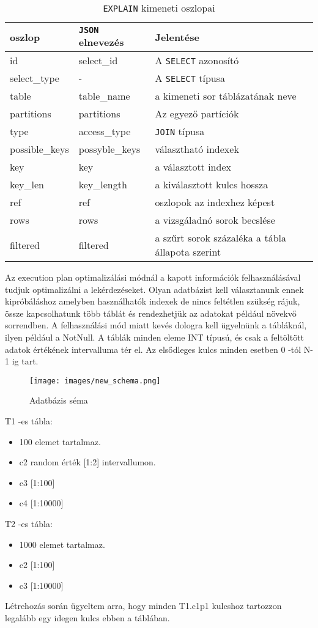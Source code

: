 \begin{table}[h!]
\centering
\caption{\texttt{EXPLAIN} kimeneti oszlopai}
\medskip
\label{tab:cpuvsgpu}
\begin{tabular}{|p{4cm}|p{4cm}|p{6cm}|}
\hline
oszlop & \texttt{JSON} elnevezés & Jelentése \\
\hline
id & select\_id & A \texttt{SELECT} azonosító \\
\hline
select\_type & - & A \texttt{SELECT} típusa \\
\hline
table & table\_name & a kimeneti sor táblázatának neve  \\
\hline
partitions & partitions & Az egyező partíciók \\
\hline
type & access\_type & \texttt{JOIN} típusa  \\
\hline
possible\_keys & possyble\_keys & választható indexek \\
\hline
key & key & a választott index \\
\hline
key\_len & key\_length & a kiválasztott kulcs hossza \\
\hline
ref & ref & oszlopok az indexhez képest \\
\hline
rows & rows & a vizsgáladnó sorok becslése \\
\hline
filtered & filtered & a szűrt sorok százaléka a tábla állapota szerint \\
\hline
\end{tabular}
\end{table}


Az execution plan optimalizálási módnál a kapott információk felhasználásával tudjuk optimalizálni a lekérdezéseket.
Olyan adatbázist kell választanunk ennek kipróbáláshoz amelyben használhatók indexek de nincs feltétlen szükség rájuk, össze kapcsolhatunk több táblát és rendezhetjük az adatokat például növekvő sorrendben. A felhasználási mód miatt kevés dologra kell ügyelnünk a tábláknál, ilyen például a NotNull. A táblák minden eleme INT típusú, és csak a feltöltött adatok értékének intervalluma tér el. Az elsődleges kulcs minden esetben 0 -tól N-1 ig tart.

\begin{figure}[h!]
\centering
\texttt{[image: images/new\_schema.png]}
\caption{Adatbázis séma}
\label{fig:schema}
\end{figure}

T1 -es tábla:
\begin{itemize}
\item 100 elemet tartalmaz.
\item c2    random érték [1:2] intervallumon.
\item c3    [1:100]
\item c4    [1:10000]
\end{itemize}
T2 -es tábla:
\begin{itemize}
\item 1000 elemet tartalmaz.
\item c2    [1:100]
\item c3    [1:10000]
\end{itemize}
Létrehozás során ügyeltem arra, hogy minden T1.c1p1 kulcshoz tartozzon legalább egy idegen kulcs ebben a táblában.

